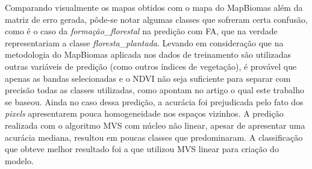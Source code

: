 Comparando visualmente os mapas obtidos com o mapa do MapBiomas além da matriz de erro gerada, pôde-se notar algumas classes que sofreram certa confusão, como é o caso da \emph{formação\_florestal} na predição com FA, que na verdade representariam a classe \emph{floresta\_plantada}. Levando em consideração que na  metodologia do MapBiomas aplicada nos dados de
treinamento são utilizadas outras variáveis de predição (como outros
índices de vegetação), é provável que apenas as bandas selecionadas e o
NDVI não seja suficiente para separar com precisão todas as classes
utilizadas, como \cite{lu-weng} apontam no artigo o qual este trabalho se
baseou. Ainda no caso dessa predição, a acurácia foi prejudicada pelo
fato dos \emph{pixels} apresentarem pouca homogeneidade nos espaços
vizinhos. A predição realizada com o algoritmo MVS com núcleo não
linear, apesar de apresentar uma acurácia mediana, resultou em poucas
classes que predominaram. A classificação que obteve melhor resultado
foi a que utilizou MVS linear para criação do modelo.
